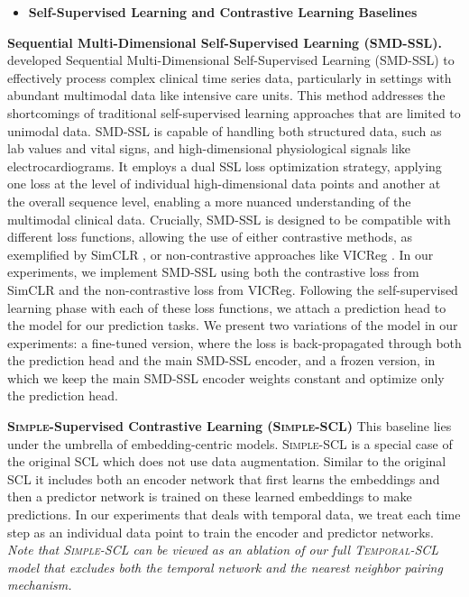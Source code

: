 \documentclass[pmlr,twocolumn,10pt]{jmlr} %
\begin{document}
\begin{itemize}
    \item \textbf{Self-Supervised Learning and Contrastive Learning Baselines}
    \vspace{-0.5em}
\end{itemize}
\noindent
\textbf{Sequential Multi-Dimensional Self-Supervised Learning (SMD-SSL).}
\citet{raghu2023sequential} developed Sequential Multi-Dimensional Self-Supervised Learning (SMD-SSL) to effectively process complex clinical time series data, particularly in settings with abundant multimodal data like intensive care units. This method addresses the shortcomings of traditional self-supervised learning approaches that are limited to unimodal data. SMD-SSL is capable of handling both structured data, such as lab values and vital signs, and high-dimensional physiological signals like electrocardiograms. It employs a dual SSL loss optimization strategy, applying one loss at the level of individual high-dimensional data points and another at the overall sequence level, enabling a more nuanced understanding of the multimodal clinical data. Crucially, SMD-SSL is designed to be compatible with different loss functions, allowing the use of either contrastive methods, as exemplified by SimCLR \citep{chen2020simple}, or non-contrastive approaches like VICReg \citep{bardes2021vicreg}. In our experiments, we implement SMD-SSL using both the contrastive loss from SimCLR and the non-contrastive loss from VICReg. Following the self-supervised learning phase with each of these loss functions, we attach a prediction head to the model for our prediction tasks. We present two variations of the model in our experiments: a fine-tuned version, where the loss is back-propagated through both the prediction head and the main SMD-SSL encoder, and a frozen version, in which we keep the main SMD-SSL encoder weights constant and optimize only the prediction head.

\vspace{.2em}
\noindent
\textbf{\textsc{Simple}-Supervised Contrastive Learning ({\textsc{Simple-SCL}})}
This baseline lies under the umbrella of embedding-centric models. \textsc{Simple-SCL} is a special case of the original \textsc{SCL} \citep{khosla2020supervised} which does not use data augmentation. Similar to the original \textsc{SCL} it includes both an encoder network that first learns the embeddings and then a predictor network is trained on these learned embeddings to make predictions. In our experiments that deals with temporal data, we treat each time step as an individual data point to train the encoder and predictor networks. \emph{Note that \textsc{Simple-SCL} can be viewed as an ablation of our full \textsc{Temporal-SCL} model that excludes both the temporal network and the nearest neighbor pairing mechanism.}  
\end{document}
